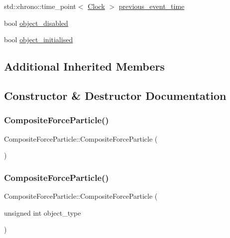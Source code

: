 \begin{DoxyCompactItemize}
\item 
std\+::chrono\+::time\+\_\+point$<$ \mbox{\hyperlink{universe_8h_a0ef8d951d1ca5ab3cfaf7ab4c7a6fd80}{Clock}} $>$ \mbox{\hyperlink{classCompositeForceParticle_ad9b33180a06a93964c089b698067e9c5}{previous\+\_\+event\+\_\+time}}
\item 
bool \mbox{\hyperlink{classCompositeForceParticle_a15114f4cc0922b93cede1a1357914336}{object\+\_\+disabled}}
\item 
bool \mbox{\hyperlink{classCompositeForceParticle_a4a54f289c844a65ebeb017fb27a84199}{object\+\_\+initialised}}
\end{DoxyCompactItemize}
\subsection*{Additional Inherited Members}


\subsection{Constructor \& Destructor Documentation}
\mbox{\label{classCompositeForceParticle_ae00ad8621af6155c86ee3205c1e2afdb}} 
\subsubsection{\texorpdfstring{Composite\+Force\+Particle()}{CompositeForceParticle()}\hspace{0.1cm}{\footnotesize\ttfamily [1/4]}}
{\footnotesize\ttfamily Composite\+Force\+Particle\+::\+Composite\+Force\+Particle (\begin{DoxyParamCaption}{ }\end{DoxyParamCaption})\hspace{0.3cm}{\ttfamily [inline]}}

\mbox{\label{classCompositeForceParticle_a967036ded4212fcd6d4213275145dc50}} 
\subsubsection{\texorpdfstring{Composite\+Force\+Particle()}{CompositeForceParticle()}\hspace{0.1cm}{\footnotesize\ttfamily [2/4]}}
{\footnotesize\ttfamily Composite\+Force\+Particle\+::\+Composite\+Force\+Particle (\begin{DoxyParamCaption}\item[{unsigned int}]{object\+\_\+type }\end{DoxyParamCaption})\hspace{0.3cm}{\ttfamily [inline]}}

